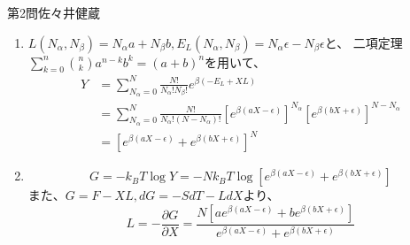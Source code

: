 \documentclass[fleqn]{jbook}
\begin{document}
\begin{answer}{第2問}{佐々井健蔵}
\begin{enumerate}
\begin{align*}
S(E_T-E_L,L_T-L)&-S(E_T,L_T)=-E_L\left. \frac{\partial S}{\partial E}\right|_{E=E_T}
                            -L  \left. \frac{\partial S}{\partial L}\right|_{L=L_T}\\
&+\frac{1}{2}\left( E_L^2\left. \frac{\partial ^2S}{\partial E^2}\right|_{E=E_T} 
+2E_L L \left. \frac{\partial ^2S}{\partial E \partial L}\right|_{E=E_T,L=L_T}
+L^2  \left. \frac{\partial ^2 S}{\partial L^2}\right|_{L=L_T}\right)+\cdots
\end{align*}
オーダーで考えると、第二項以降は第一項に$E_L/ E_T,L/L_T$をかけたもの程度の大きさしかなく、
第一項に比べて無視できるので、$T=(\partial S/\partial E)^{-1}|_{E=E_T}$と$TdS=dE-XdL$も用いると、
\begin{equation}
S(E_T-E_L,L_T-L)-S(E_T,L_T)=\frac{-E_L+XL}{T}
\end{equation}
\begin{equation}
\therefore p(E_L,L)\propto \exp \left\{\ \frac{1}{k_BT} (-E_L+XL)\right\}
\end{equation}

\item $L(N_{\alpha },N_{\beta })=N_{\alpha }a+N_{\beta }b,
E_L(N_{\alpha },N_{\beta })=N_{\alpha }\epsilon -N_{\beta }\epsilon$と、
二項定理$\sum_{k=0}^{n}\binom{n}{k}a^{n-k}b^{k}=(a+b)^n$を用いて、
\begin{align*}
Y&=\sum ^{N}_{N_{\alpha}=0}\frac{N!}{N_{\alpha }!N_{\beta }!}e^{ \beta (-E_L+XL) }\\
 &=\sum ^{N}_{N_{\alpha}=0}\frac{N!}{N_{\alpha }!(N-N_{\alpha })!}
   \left[e^{\beta (aX-\epsilon )}\right]^{N_{\alpha }}
   \left[e^{\beta (bX+\epsilon )}\right]^{N-N_{\alpha }}\\
 &=\left[e^{\beta (aX-\epsilon )}+e^{\beta (bX+\epsilon )}\right]^N
\end{align*}
\item \begin{equation}
G=-k_BT\log Y =-Nk_BT\log \left[e^{\beta (aX-\epsilon )}+e^{\beta (bX+\epsilon )}\right]
\end{equation}
また、$G=F-XL,dG=-SdT-LdX$より、
\begin{equation}
L=-\frac{\partial G}{\partial X}
=\frac{N\left[ae^{\beta (aX-\epsilon )}+be^{\beta (bX+\epsilon )}\right]}
{e^{\beta (aX-\epsilon )}+e^{\beta (bX+\epsilon )}}
\end{equation}

\end{enumerate}
\end{answer}
\end{document}

